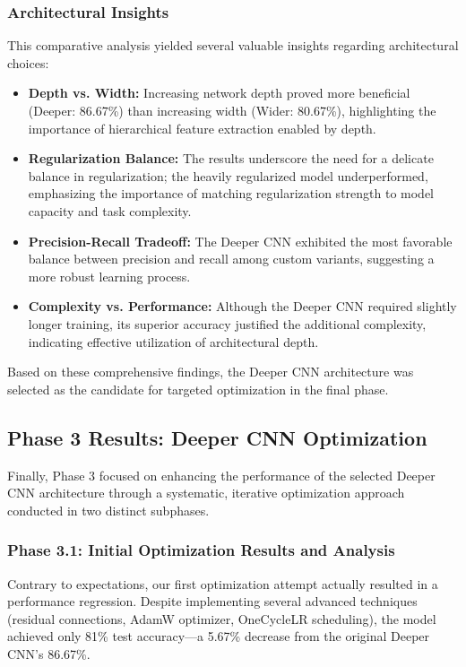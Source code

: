 \subsubsection{Architectural Insights}
This comparative analysis yielded several valuable insights regarding architectural choices:
\begin{itemize}
    \item \textbf{Depth vs. Width:} Increasing network depth proved more beneficial (Deeper: 86.67\%) than increasing width (Wider: 80.67\%), highlighting the importance of hierarchical feature extraction enabled by depth.
    \item \textbf{Regularization Balance:} The results underscore the need for a delicate balance in regularization; the heavily regularized model underperformed, emphasizing the importance of matching regularization strength to model capacity and task complexity.
    \item \textbf{Precision-Recall Tradeoff:} The Deeper CNN exhibited the most favorable balance between precision and recall among custom variants, suggesting a more robust learning process.
    \item \textbf{Complexity vs. Performance:} Although the Deeper CNN required slightly longer training, its superior accuracy justified the additional complexity, indicating effective utilization of architectural depth.
\end{itemize}
Based on these comprehensive findings, the Deeper CNN architecture was selected as the candidate for targeted optimization in the final phase.

\subsection{Phase 3 Results: Deeper CNN Optimization}
Finally, Phase 3 focused on enhancing the performance of the selected Deeper CNN architecture through a systematic, iterative optimization approach conducted in two distinct subphases.

\subsubsection{Phase 3.1: Initial Optimization Results and Analysis}
Contrary to expectations, our first optimization attempt actually resulted in a performance regression. Despite implementing several advanced techniques (residual connections, AdamW optimizer, OneCycleLR scheduling), the model achieved only 81\% test accuracy—a 5.67\% decrease from the original Deeper CNN's 86.67\%.

